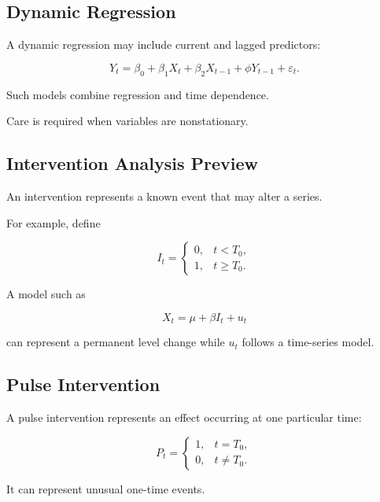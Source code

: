 \subsection{Dynamic Regression}
\label{subsec:dynamic-regression}

A dynamic regression may include current and lagged predictors:

\[
\boxed{
Y_t
=
\beta_0
+
\beta_1X_t
+
\beta_2X_{t-1}
+
\phi Y_{t-1}
+
\varepsilon_t.
}
\]

Such models combine regression and time dependence.

Care is required when variables are nonstationary.

\subsection{Intervention Analysis Preview}
\label{subsec:intervention-analysis}

An intervention represents a known event that may alter a series.

For example, define

\[
I_t
=
\begin{cases}
0,&t<T_0,\\
1,&t\geq T_0.
\end{cases}
\]

A model such as

\[
\boxed{
X_t
=
\mu
+
\beta I_t
+
u_t
}
\]

can represent a permanent level change while \(u_t\) follows a time-series
model.

\subsection{Pulse Intervention}
\label{subsec:pulse-intervention}

A pulse intervention represents an effect occurring at one particular
time:

\[
\boxed{
P_t
=
\begin{cases}
1,&t=T_0,\\
0,&t\neq T_0.
\end{cases}
}
\]

It can represent unusual one-time events.

